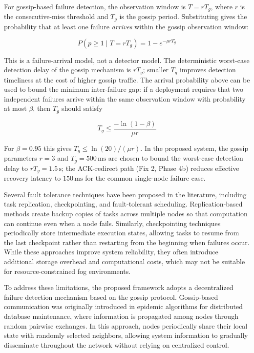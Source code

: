 \documentclass[conference]{IEEEtran}
\begin{document}
    For gossip-based failure detection, the observation window is $T = rT_g$, where $r$ is the consecutive-miss threshold and $T_g$ is the gossip period. Substituting gives the probability that at least one failure \emph{arrives} within the gossip observation window:

    \begin{equation}
    P(p \geq 1 \mid T = rT_g) = 1 - e^{-\mu r T_g}
    \end{equation}

    This is a failure-arrival model, not a detector model. The deterministic worst-case detection delay of the gossip mechanism is $rT_g$; smaller $T_g$ improves detection timeliness at the cost of higher gossip traffic. The arrival probability above can be used to bound the minimum inter-failure gap: if a deployment requires that two independent failures arrive within the same observation window with probability at most $\beta$, then $T_g$ should satisfy

    \begin{equation}
    T_g \leq \frac{-\ln(1-\beta)}{\mu r}
    \end{equation}

    For $\beta = 0.95$ this gives $T_g \leq \ln(20)/(\mu r)$. In the proposed system, the gossip parameters $r=3$ and $T_g=500\,\text{ms}$ are chosen to bound the worst-case detection delay to $rT_g = 1.5\,\text{s}$; the ACK-redirect path (Fix 2, Phase 4b) reduces effective recovery latency to $150\,\text{ms}$ for the common single-node failure case.

    Several fault tolerance techniques have been proposed in the literature, including task replication, checkpointing, and fault-tolerant scheduling. Replication-based methods create backup copies of tasks across multiple nodes so that computation can continue even when a node fails. Similarly, checkpointing techniques \cite{goswami2004checkpoint} periodically store intermediate execution states, allowing tasks to resume from the last checkpoint rather than restarting from the beginning when failures occur. While these approaches improve system reliability, they often introduce additional storage overhead and computational costs, which may not be suitable for resource-constrained fog environments.

    To address these limitations, the proposed framework adopts a decentralized failure detection mechanism based on the gossip protocol. Gossip-based communication \cite{demers1988epidemic} was originally introduced in epidemic algorithms for distributed database maintenance, where information is propagated among nodes through random pairwise exchanges. In this approach, nodes periodically share their local state with randomly selected neighbors, allowing system information to gradually disseminate throughout the network without relying on centralized control.
\end{document}
